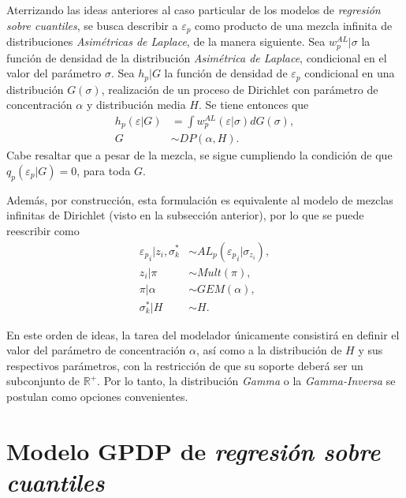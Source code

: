 Aterrizando las ideas anteriores al caso particular de los modelos de \textit{regresi\'on sobre cuantiles}, se busca describir a $\varepsilon_p$ como producto de una mezcla infinita de distribuciones \textit{Asim\'etricas de Laplace}, de la manera siguiente. Sea $w_p^{AL} | \sigma$ la funci\'on de densidad de la distribuci\'on \textit{Asim\'etrica de Laplace}, condicional en el valor del par\'ametro $\sigma$. Sea $h_p|G$ la funci\'on de densidad de $\varepsilon_p$ condicional en una distribuci\'on $G(\sigma)$, realizaci\'on de un proceso de Dirichlet con par\'ametro de concentraci\'on $\alpha$ y distribuci\'on media $H$. Se tiene entonces que
\begin{equation*}
\begin{aligned}
    h_p(\varepsilon|G) &= \int w_p^{AL}(\varepsilon|\sigma)dG(\sigma), \\
    G &\sim DP(\alpha,H).
\end{aligned}
\end{equation*}
Cabe resaltar que a pesar de la mezcla, se sigue cumpliendo la condici\'on de que $q_p(\varepsilon_p|G) = 0$, para toda $G$.

Adem\'as, por construcci\'on, esta formulaci\'on es equivalente al modelo de mezclas infinitas de Dirichlet (visto en la subsecci\'on anterior), por lo que se puede reescribir como
\begin{equation*}
\begin{aligned}
   {\varepsilon_p}_i | z_i, \sigma_k^* &\sim AL_p({\varepsilon_p}_i | \sigma_{z_i}), \\
   z_i | \pi &\sim Mult(\pi), \\
   \pi | \alpha &\sim GEM(\alpha), \\
   \sigma_k^* | H &\sim H.
\end{aligned}
\end{equation*}

En este orden de ideas, la tarea del modelador \'unicamente consistir\'a en definir el valor del par\'ametro de concentraci\'on $\alpha$, as\'i como a la distribuci\'on de $H$ y sus respectivos par\'ametros, con la restricci\'on de que su soporte deber\'a ser un subconjunto de $\mathbb{R}^+$. Por lo tanto, la distribuci\'on \textit{Gamma} o la \textit{Gamma-Inversa} se postulan como opciones convenientes.

\section{Modelo GPDP de \textit{regresi\'on sobre cuantiles}}

